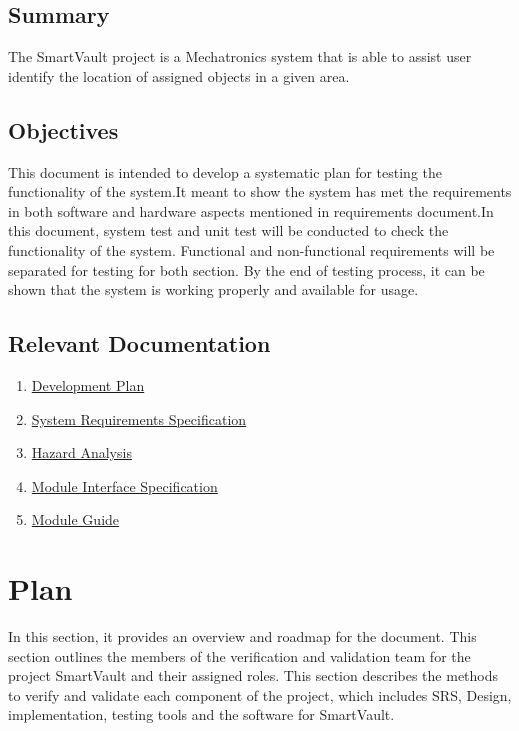 \documentclass[12pt, titlepage]{article}
\begin{document}
\subsection{Summary}

The SmartVault project is a Mechatronics system that is able to assist user identify the location of assigned objects in a given area.

\subsection{Objectives}

This document is intended to develop a systematic plan for testing the functionality of the system.It meant to show the system has met the requirements in both software and hardware aspects mentioned in requirements document.In this document, system test and unit test will be conducted to check the functionality of the system. Functional and non-functional requirements will be separated for testing for both section. By the end of testing process, it can be shown that the system is working properly and available for usage.

\subsection{Relevant Documentation}

\begin{enumerate}
    \item \href{https://github.com/Edwardhyw/smartVault/tree/main/docs/DevelopmentPlan}{Development Plan}
    \item \href{https://github.com/Edwardhyw/smartVault/tree/main/docs/SRS}{System Requirements Specification} 
    \item \href{https://github.com/Edwardhyw/smartVault/tree/main/docs/HazardAnalysis}{Hazard Analysis} 
    \item \href{https://github.com/Edwardhyw/smartVault/tree/main/docs/Design/MIS}{Module Interface Specification} 
    \item \href{https://github.com/Edwardhyw/smartVault/tree/main/docs/Design/MG}{Module Guide} 
\end{enumerate}

\section{Plan}
In this section, it provides an overview and roadmap for the document. This section outlines the members of the verification and validation team for the project SmartVault and their assigned roles. This section describes the methods to verify and validate each component of the project, which includes SRS, Design, implementation, testing tools and the software for SmartVault.
\end{document}
